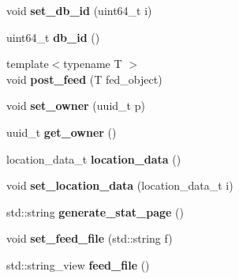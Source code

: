 \begin{DoxyCompactItemize}
\item 
\mbox{\label{structobj__data_a141a2566b61bc97e6acc945ece2a2705}} 
void {\bfseries set\+\_\+db\+\_\+id} (uint64\+\_\+t i)
\item 
\mbox{\label{structobj__data_a768ad168c38dd1de4c51c77d77b8f830}} 
uint64\+\_\+t {\bfseries db\+\_\+id} ()
\item 
\mbox{\label{structobj__data_af8838a3acb17974161ced6008dbc0329}} 
{\footnotesize template$<$typename T $>$ }\\void {\bfseries post\+\_\+feed} (T fed\+\_\+object)
\item 
\mbox{\label{structobj__data_a26cc632406e1647b2aad86024b41ef7d}} 
void {\bfseries set\+\_\+owner} (uuid\+\_\+t p)
\item 
\mbox{\label{structobj__data_ae44c9aec7efacb48040cb4e8e3ccea85}} 
uuid\+\_\+t {\bfseries get\+\_\+owner} ()
\item 
\mbox{\label{structobj__data_aac7cee17fb9dbb69e30b972fd3749b37}} 
location\+\_\+data\+\_\+t {\bfseries location\+\_\+data} ()
\item 
\mbox{\label{structobj__data_a52e67c2cb1c02d7d72dadbc47b2ce93f}} 
void {\bfseries set\+\_\+location\+\_\+data} (location\+\_\+data\+\_\+t i)
\item 
\mbox{\label{structobj__data_ab51d261012414f61e2d028ee71892731}} 
std\+::string {\bfseries generate\+\_\+stat\+\_\+page} ()
\item 
\mbox{\label{structobj__data_abeaf5cae3645dbf7b764cfb6b62a82c3}} 
void {\bfseries set\+\_\+feed\+\_\+file} (std\+::string f)
\item 
\mbox{\label{structobj__data_a4ebed328e9028591a51dd89f26f8b5ab}} 
std\+::string\+\_\+view {\bfseries feed\+\_\+file} ()
\end{DoxyCompactItemize}
